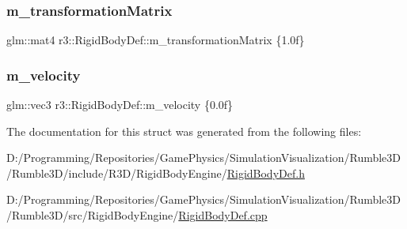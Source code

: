 \mbox{\label{structr3_1_1_rigid_body_def_a5110c4790357fbbfad4d5cc5dd89c4d6}} 
\subsubsection{\texorpdfstring{m\+\_\+transformation\+Matrix}{m\_transformationMatrix}}
{\footnotesize\ttfamily glm\+::mat4 r3\+::\+Rigid\+Body\+Def\+::m\+\_\+transformation\+Matrix \{1.\+0f\}}

\mbox{\label{structr3_1_1_rigid_body_def_a3acdc6c652745324b72165c6fc42bc39}} 
\subsubsection{\texorpdfstring{m\+\_\+velocity}{m\_velocity}}
{\footnotesize\ttfamily glm\+::vec3 r3\+::\+Rigid\+Body\+Def\+::m\+\_\+velocity \{0.\+0f\}}



The documentation for this struct was generated from the following files\+:\begin{DoxyCompactItemize}
\item 
D\+:/\+Programming/\+Repositories/\+Game\+Physics/\+Simulation\+Visualization/\+Rumble3\+D/\+Rumble3\+D/include/\+R3\+D/\+Rigid\+Body\+Engine/\mbox{\hyperlink{_rigid_body_def_8h}{Rigid\+Body\+Def.\+h}}\item 
D\+:/\+Programming/\+Repositories/\+Game\+Physics/\+Simulation\+Visualization/\+Rumble3\+D/\+Rumble3\+D/src/\+Rigid\+Body\+Engine/\mbox{\hyperlink{_rigid_body_def_8cpp}{Rigid\+Body\+Def.\+cpp}}\end{DoxyCompactItemize}

